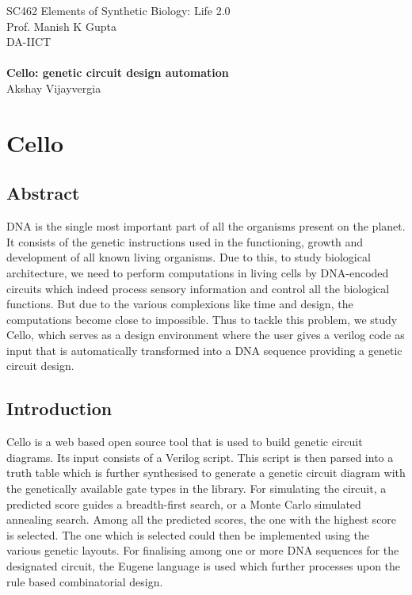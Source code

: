 \documentclass[11pt]{article}
\begin{document}

\begin{center}
{\large SC462 Elements of Synthetic Biology: Life 2.0} \\
Prof. Manish K Gupta \\
DA-IICT\\
\hspace{0.25in} \\
{\Large\bf Cello: genetic circuit design automation} \\
Akshay Vijayvergia
\end{center}


\section*{ Cello}
\subsection*{Abstract}
DNA is the single most important part of all the organisms present on the planet. It consists of the genetic instructions used in the functioning, growth and development of all known living organisms. Due to this, to study biological architecture, we need to perform computations in living cells by DNA-encoded circuits which indeed process sensory information and control all the biological functions. But due to the various complexions like time and design, the computations become close to impossible. Thus to tackle this problem, we study Cello, which serves as a design environment where the user gives a verilog code as input that is automatically transformed into a DNA sequence providing a genetic circuit design. 

\subsection*{Introduction}
Cello is a web based open source tool that is used to build genetic circuit diagrams. Its input consists of a Verilog script. This script is then parsed into a truth table which is further synthesised to generate a genetic circuit diagram with the genetically available gate types in the library. For simulating the circuit, a predicted score guides a breadth-first search, or a Monte Carlo simulated annealing search. Among all the predicted scores, the one with the highest score is selected. The one which is selected could then be implemented using the various genetic layouts. For finalising among one or more DNA sequences for the designated circuit, the Eugene language is used which further processes upon the rule based combinatorial design.
\end{document}
